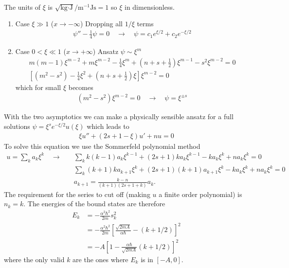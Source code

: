 \documentclass[10pt,a4paper]{article}
\theoremstyle{definition}
\begin{document}
The units of $\xi$ is $\sqrt{\text{kg}\cdot \text{J}}/\text{m}^{-1}\text{Js}=1$ so $\xi$ in dimensionless.
\begin{enumerate}
    \item Case $\xi\gg 1$ ($x\rightarrow-\infty$)
    Dropping all $1/\xi$ terms
    \begin{align}
        \psi''-\frac{1}{4}\psi=0\quad\rightarrow\quad\psi=c_1 e^{\xi/2}+c_2 e^{-\xi/2}
    \end{align}
    \item Case $0<\xi\ll 1$ ($x\rightarrow+\infty$)
    Ansatz $\psi\sim\xi^m$
    \begin{align}
        m(m-1)\xi^{m-2}+m\xi^{m-2}-\frac{1}{4}\xi^m+\left(n+s+\frac{1}{2}\right)\xi^{m-1}-s^2\xi^{m-2}=0\\
        \left[(m^2-s^2)-\frac{1}{4}\xi^2+\left(n+s+\frac{1}{2}\right)\xi\right]\xi^{m-2}=0
    \end{align}
    which for small $\xi$ becomes
    \begin{align}
        (m^2-s^2)\xi^{m-2}=0 \quad\rightarrow\quad\psi=\xi^{\pm s}
    \end{align}
\end{enumerate}
With the two asymptotics we can make a physically sensible ansatz for a full solutions $\psi=\xi^s e^{-\xi/2}u(\xi)$ which leads to
\begin{align}
    \xi u''+(2s+1-\xi)u'+n u=0
\end{align}
To solve this equation we use the Sommerfeld polynomial method
\begin{align}
    u=\sum_ka_k\xi^k\quad\rightarrow\quad
    &\sum_kk(k-1)a_k\xi^{k-1}+(2s+1)ka_k\xi^{k-1}-ka_k\xi^k+na_k\xi^k=0\\
    &\sum_k(k+1)ka_{k+1}\xi^{k}+(2s+1)(k+1)a_{k+1}\xi^{k}-ka_k\xi^k+na_k\xi^k=0\\
    &a_{k+1}=\frac{k-n}{(k+1)(2s+1+k)}a_k.
\end{align}
The requirement for the series to cut off (making $u$ a finite order polynomial) is $n_k=k$. The energies of the bound states are therefore
\begin{align}
    E_k&=-\frac{\alpha^2\hbar^2}{2m}s_k^2\\
    &=-\frac{\alpha^2\hbar^2}{2m}\left[\frac{\sqrt{2mA}}{\alpha\hbar}-(k+1/2)\right]^2\\
    &=-A\left[1-\frac{\alpha\hbar}{\sqrt{2mA}}(k+1/2)\right]^2
\end{align}
where the only valid $k$ are the ones where $E_k$ is in $[-A,0]$.
\end{document}
